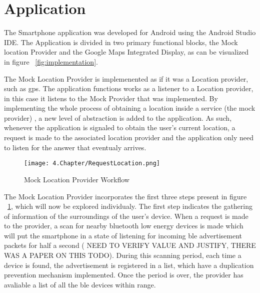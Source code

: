 \section{Application}
\label{sec:app}


The Smartphone application was developed for Android using the Android Studio IDE. The Application is divided in two primary functional blocks, the Mock location Provider and the Google Maps Integrated Display, as can be visualized in figure ~\ref{fig:implementation}.

The Mock Location Provider is implemenented as if it was a Location provider, such as gps. The application functions works as a listener to a Location provider, in this case it listens to the Mock Provider that was implemented. By implementing the whole process of obtaining a location inside a service (the mock provider) , a new level of abstraction is added to the application. As such, whenever the application is signaled to obtain the user's current location, a request is made to the associated location provider and the application only need to listen for the answer that eventualy arrives.

\begin{figure}
	\centering
		\texttt{[image: 4.Chapter/RequestLocation.png]}
	\caption[Mock Location Provider Workflow]{Mock Location Provider Workflow}
	\label{fig:MockProvider}
\end{figure}

The Mock Location Provider incorporates the first three steps present in figure ~\ref{fig:MockProvider}, which will now be explored individualy. The first step indicates the gathering of information of the surroundings of the user's device. When a request is made to the provider, a scan for nearby bluetooth low energy devices is made which will put the smartphone in a state of listening for incoming ble advertisement packets for half a second ( NEED TO VERIFY VALUE AND JUSTIFY, THERE WAS A PAPER ON THIS TODO). During this scanning period, each time a device is found, the advertisement is registered in a list, which have a duplication prevention mechanism implemented. Once the period is over, the provider has avaliable a list of all the ble devices within range.   

